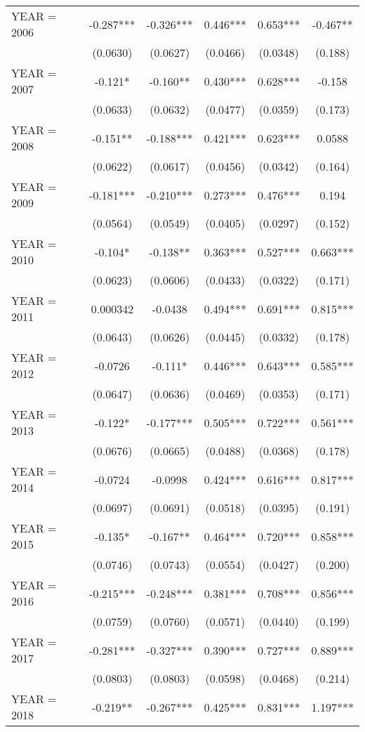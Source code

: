 \begin{tabular}{lccccc}
YEAR = 2006 & -0.287*** & -0.326*** & 0.446*** & 0.653*** & -0.467** \\
 & (0.0630) & (0.0627) & (0.0466) & (0.0348) & (0.188) \\
YEAR = 2007 & -0.121* & -0.160** & 0.430*** & 0.628*** & -0.158 \\
 & (0.0633) & (0.0632) & (0.0477) & (0.0359) & (0.173) \\
YEAR = 2008 & -0.151** & -0.188*** & 0.421*** & 0.623*** & 0.0588 \\
 & (0.0622) & (0.0617) & (0.0456) & (0.0342) & (0.164) \\
YEAR = 2009 & -0.181*** & -0.210*** & 0.273*** & 0.476*** & 0.194 \\
 & (0.0564) & (0.0549) & (0.0405) & (0.0297) & (0.152) \\
YEAR = 2010 & -0.104* & -0.138** & 0.363*** & 0.527*** & 0.663*** \\
 & (0.0623) & (0.0606) & (0.0433) & (0.0322) & (0.171) \\
YEAR = 2011 & 0.000342 & -0.0438 & 0.494*** & 0.691*** & 0.815*** \\
 & (0.0643) & (0.0626) & (0.0445) & (0.0332) & (0.178) \\
YEAR = 2012 & -0.0726 & -0.111* & 0.446*** & 0.643*** & 0.585*** \\
 & (0.0647) & (0.0636) & (0.0469) & (0.0353) & (0.171) \\
YEAR = 2013 & -0.122* & -0.177*** & 0.505*** & 0.722*** & 0.561*** \\
 & (0.0676) & (0.0665) & (0.0488) & (0.0368) & (0.178) \\
YEAR = 2014 & -0.0724 & -0.0998 & 0.424*** & 0.616*** & 0.817*** \\
 & (0.0697) & (0.0691) & (0.0518) & (0.0395) & (0.191) \\
YEAR = 2015 & -0.135* & -0.167** & 0.464*** & 0.720*** & 0.858*** \\
 & (0.0746) & (0.0743) & (0.0554) & (0.0427) & (0.200) \\
YEAR = 2016 & -0.215*** & -0.248*** & 0.381*** & 0.708*** & 0.856*** \\
 & (0.0759) & (0.0760) & (0.0571) & (0.0440) & (0.199) \\
YEAR = 2017 & -0.281*** & -0.327*** & 0.390*** & 0.727*** & 0.889*** \\
 & (0.0803) & (0.0803) & (0.0598) & (0.0468) & (0.214) \\
YEAR = 2018 & -0.219** & -0.267*** & 0.425*** & 0.831*** & 1.197*** \\

\end{tabular}
